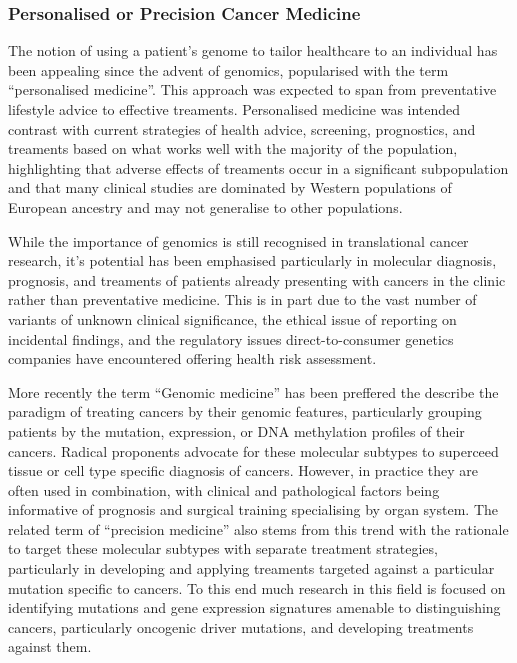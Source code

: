 \subsubsection{Personalised or Precision Cancer Medicine}
The notion of using a patient's genome to tailor healthcare to an individual has been appealing since the advent of genomics, popularised with the term ``personalised medicine''. This approach was expected to span from preventative lifestyle advice to effective treaments. Personalised medicine was intended contrast with current strategies of health advice, screening, prognostics, and treaments based on what works well with the majority of the population, highlighting that adverse effects of treaments occur in a significant subpopulation and that many clinical studies are dominated by Western populations of European ancestry and may not generalise to other populations.

While the importance of genomics is still recognised in translational cancer research, it's potential has been emphasised particularly in molecular diagnosis, prognosis, and treaments of patients already presenting with cancers in the clinic rather than preventative medicine. This is in part due to the vast number of variants of unknown clinical significance, the ethical issue of reporting on incidental findings, and the regulatory issues direct-to-consumer genetics companies have encountered offering health risk assessment.

More recently the term ``Genomic medicine'' has been preffered the describe the paradigm of treating cancers by their genomic features, particularly grouping patients by the mutation, expression, or DNA methylation profiles of their cancers. Radical proponents advocate for these molecular subtypes to superceed tissue or cell type specific diagnosis of cancers. However, in practice they are often used in combination, with clinical and pathological factors being informative of prognosis and surgical training specialising by organ system. The related term of ``precision medicine'' also stems from this trend with the rationale to target these molecular subtypes with separate treatment strategies, particularly in developing and applying treaments targeted against a particular mutation specific to cancers. To this end much research in this field is focused on identifying mutations and gene expression signatures amenable to distinguishing cancers, particularly oncogenic driver mutations, and developing treatments against them.

